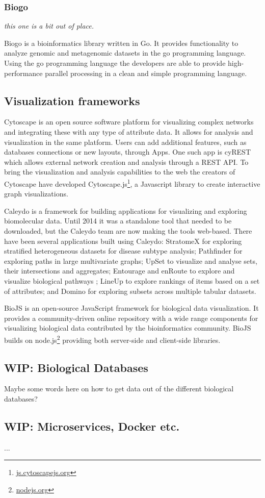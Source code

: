 \subsubsection*{Biogo} 
\emph{this one is a bit out of place.}

Biogo is a bioinformatics library written in Go. It provides functionality to
analyze genomic and metagenomic datasets in the go programming
language.\cite{Kortschak005033} Using the go programming language the developers
are able to provide high-performance parallel processing in a clean and simple
programming language. 

\subsection*{Visualization frameworks} 
Cytoscape is an open source software platform for visualizing complex
networks and integrating these with any type of attribute
data\cite{shannon2003cytoscape}. It allows for analysis and visualization in the
same platform. Users can add additional features, such as databases connections
or new layouts, through Apps. One such app is cyREST which allows external network
creation and analysis through a REST API\cite{ono2015cyrest}.
To bring the visualization and analysis
capabilities to the web the creators of Cytoscape have developed
Cytoscape.js\footnote{\url{js.cytoscapejs.org}}, a Javascript library to create
interactive graph visualizations. 


Caleydo is a framework for building applications for visualizing and exploring
biomolecular data\cite{cleydo}. Until 2014 it was a standalone tool that needed
to be downloaded, but the Caleydo team are now making the tools web-based. There
have been several applications built using Caleydo: StratomeX for exploring
stratified heterogeneous datasets for disease subtype analysis\cite{stratomex};
Pathfinder for exploring paths in large multivariate graphs\cite{pathfinder};
UpSet to visualize and analyse sets, their intersections and
aggregates\cite{upset}; Entourage and enRoute to explore and visualize
biological pathways \cite{entourage}\cite{enroute}; LineUp to explore rankings
of items based on a set of attributes\cite{lineup}; and Domino for exploring
subsets across multiple tabular datasets\cite{domino}. 

BioJS is an open-source JavaScript framework for biological data
visualization.\cite{gomez2013biojs} It provides a community-driven online
repository with a wide range components for visualizing biological data
contributed by the bioinformatics community. BioJS builds on
node.js\footnote{\url{nodejs.org}} providing both server-side and client-side
libraries. 


\subsection*{WIP: Biological Databases} 
Maybe some words here on how to get data out of the different biological
databases? 

\subsection*{WIP: Microservices, Docker etc.} 
... 


